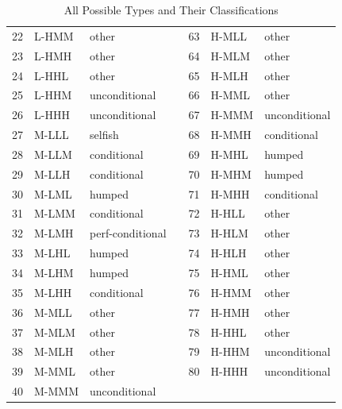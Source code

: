 \begin{table}[ht]
{\begin{tabular}{|lll|c|lll|}
  22 & L-HMM & other &  &   63 & H-MLL & other \\ 
  23 & L-HMH & other &  &   64 & H-MLM & other \\ 
  24 & L-HHL & other &  &   65 & H-MLH & other \\ 
  25 & L-HHM & unconditional &  &   66 & H-MML & other \\ 
  26 & L-HHH & unconditional &  &   67 & H-MMM & unconditional \\ 
  27 & M-LLL & selfish &  &   68 & H-MMH & conditional \\ 
  28 & M-LLM & conditional &  &   69 & H-MHL & humped \\ 
  29 & M-LLH & conditional &  &   70 & H-MHM & humped \\ 
  30 & M-LML & humped &  &   71 & H-MHH & conditional \\ 
  31 & M-LMM & conditional &  &   72 & H-HLL & other \\ 
  32 & M-LMH & perf-conditional &  &   73 & H-HLM & other \\ 
  33 & M-LHL & humped &  &   74 & H-HLH & other \\ 
  34 & M-LHM & humped &  &   75 & H-HML & other \\ 
  35 & M-LHH & conditional &  &   76 & H-HMM & other \\ 
  36 & M-MLL & other &  &   77 & H-HMH & other \\ 
  37 & M-MLM & other &  &   78 & H-HHL & other \\ 
  38 & M-MLH & other &  &   79 & H-HHM & unconditional \\ 
  39 & M-MML & other &  &   80 & H-HHH & unconditional \\ 
  40 & M-MMM & unconditional &  &  & & \\ \hline 
\end{tabular}
}
\caption{All Possible Types and Their Classifications}
\label{tbl:evo-alltypes}
\end{table}




